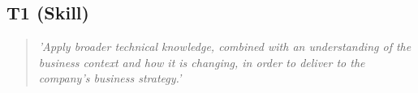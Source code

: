 \subsection*{T1 (Skill)}

  \begin{quote}
    \textit{'Apply broader technical knowledge, combined
    with an understanding of the business context and how it
    is changing, in order to deliver to the company’s business
    strategy.'}
  \end{quote}

\newpage